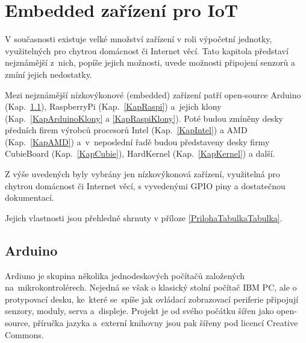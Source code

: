 \chapter{Embedded zařízení pro IoT}
\label{ChapterEmbeddedZarizeni}

V současnosti existuje velké množství zařízení v roli výpočetní jednotky, využitelných pro chytrou domácnost či Internet věcí. Tato kapitola představí nejznámější z~nich, popíše jejich možnosti, uvede možnosti připojení senzorů a zmíní jejich nedostatky. 

Mezi nejznámější nízkovýkonové (embedded) zařízení patří open-source Arduino (Kap.~\ref{KapArduino}), RaspberryPi (Kap.~\ref{KapRaspi}) a~jejich klony (Kap.~\ref{KapArduinoKlony} a \ref{KapRaspiKlony}). Poté budou zmíněny desky předních firem výrobců procesorů Intel (Kap.~\ref{KapIntel}) a AMD (Kap.~\ref{KapAMD}) a~v~neposlední řadě budou představeny desky firmy CubieBoard (Kap.~\ref{KapCubie}), HardKernel (Kap.~\ref{KapKernel}) a další. 

Z výše uvedených byly vybrány jen nízkovýkonová zařízení, využitelná pro chytrou domácnost či Internet věcí, s vyvedenými GPIO piny a dostatečnou dokumentací.

Jejich vlastnosti jsou přehledně shrnuty v příloze \ref{PrilohaTabulkaTabulka}.


\section{Arduino}
\label{KapArduino}

Ardiuno je skupina několika jednodeskových počítačů založených na~mikrokontrolérech. Nejedná se však o klasický stolní počítač IBM PC, ale o protypovací desku, ke~které se~spíše jak ovládací  zobrazovací periferie připojují senzory, moduly, serva a~displeje. Projekt je od svého počátku šířen jako open-source, příručka jazyka a~externí knihovny jsou pak šířeny pod licencí Creative Commons.
	
